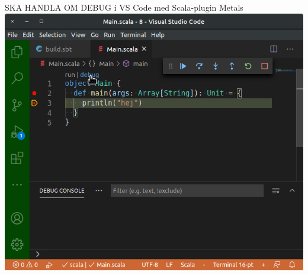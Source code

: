 \begin{Slide}{\TODO SKA HANDLA OM DEBUG i VS Code med Scala-plugin Metals}
\includegraphics[width=\textwidth]{../img/vscode-debug.png}
\end{Slide}
  



